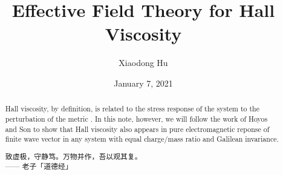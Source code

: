 \documentclass[10pt,nofootinbib,letterpaper]{revtex4}
\newcommand*{\kaishu}{\CJKfamily{kaishu}}
\begin{document}
\title{Effective Field Theory for Hall Viscosity}
\author{Xiaodong Hu}

\date{January 7, 2021}

\begin{abstract}
	Hall viscosity, by definition, is related to the stress response of the system to the perturbation of the metric \cite{avron1995viscosity,bradlyn2012kubo}. In this note, however, we will follow the work of Hoyos and Son \cite{hoyos2012hall} to show that Hall viscosity also appears in pure electromagnetic reponse of finite wave vector in any system with equal charge/mass ratio and Galilean invariance.\par
		\hfill\par
		{\centering\kaishu 致虚极，守静笃。万物并作，吾以观其复。\\[0.5em]}
	\hfill------ 老子「道德经」
\end{abstract}

\maketitle
\tableofcontents
\end{document}
